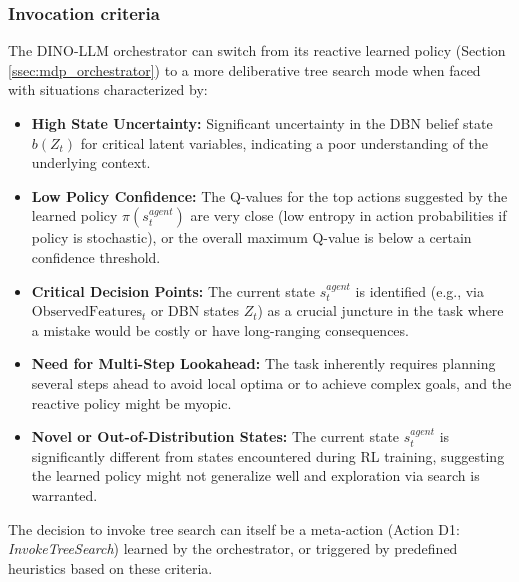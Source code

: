 \documentclass[11pt]{article}
\begin{document}
\subsubsection{Invocation criteria}
\label{sssec:tree_search_invocation}
The DINO-LLM orchestrator can switch from its reactive learned policy (Section \ref{ssec:mdp_orchestrator}) to a more deliberative tree search mode when faced with situations characterized by:
\begin{itemize}
    \item \textbf{High State Uncertainty:} Significant uncertainty in the DBN belief state $b(Z_t)$ for critical latent variables, indicating a poor understanding of the underlying context.
    \item \textbf{Low Policy Confidence:} The Q-values for the top actions suggested by the learned policy $\pi(s_t^{agent})$ are very close (low entropy in action probabilities if policy is stochastic), or the overall maximum Q-value is below a certain confidence threshold.
    \item \textbf{Critical Decision Points:} The current state $s_t^{agent}$ is identified (e.g., via $\text{ObservedFeatures}_t$ or DBN states $Z_t$) as a crucial juncture in the task where a mistake would be costly or have long-ranging consequences.
    \item \textbf{Need for Multi-Step Lookahead:} The task inherently requires planning several steps ahead to avoid local optima or to achieve complex goals, and the reactive policy might be myopic.
    \item \textbf{Novel or Out-of-Distribution States:} The current state $s_t^{agent}$ is significantly different from states encountered during RL training, suggesting the learned policy might not generalize well and exploration via search is warranted.
\end{itemize}
The decision to invoke tree search can itself be a meta-action (Action D1: \emph{InvokeTreeSearch}) learned by the orchestrator, or triggered by predefined heuristics based on these criteria.
\end{document}
